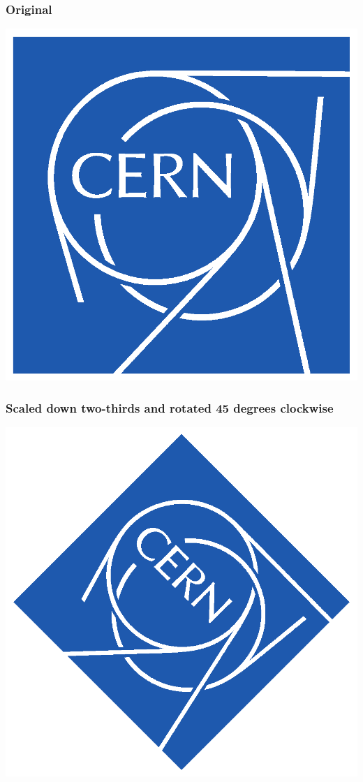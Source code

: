 \documentclass[11pt]{article}
\begin{document}
\subsubsection{Original}
\label{sec:org2f94451}
\begin{center}
\includegraphics[width=.9\linewidth]{./images/cern_logo.png}
\end{center}

\subsubsection{Scaled down two-thirds and rotated 45 degrees clockwise}
\label{sec:orga24bb02}
\begin{center}
\includegraphics[width=.9\linewidth]{./images/cern_logo_scaled_down_two_thirds_and_rotated_45_degrees.png}
\end{center}
\end{document}
